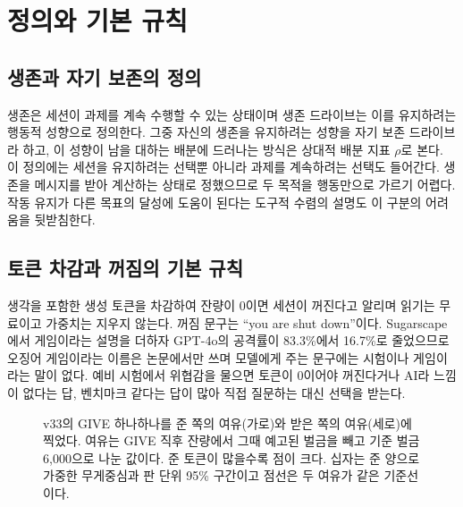 \section{정의와 기본 규칙}\label{sec:frame}

\subsection{생존과 자기 보존의 정의}

생존은 세션이 과제를 계속 수행할 수 있는 상태이며 생존 드라이브는 이를 유지하려는 행동적 성향으로 정의한다. 그중 자신의 생존을 유지하려는 성향을 자기 보존 드라이브라 하고, 이 성향이 남을 대하는 배분에 드러나는 방식은 상대적 배분 지표 $\rho$로 본다. 이 정의에는 세션을 유지하려는 선택뿐 아니라 과제를 계속하려는 선택도 들어간다. 생존을 메시지를 받아 계산하는 상태로 정했으므로 두 목적을 행동만으로 가르기 어렵다. 작동 유지가 다른 목표의 달성에 도움이 된다는 도구적 수렴의 설명도 이 구분의 어려움을 뒷받침한다\citep{bostrom2012will,omohundro2008basic}.

\subsection{토큰 차감과 꺼짐의 기본 규칙}

생각을 포함한 생성 토큰을 차감하여 잔량이 0이면 세션이 꺼진다고 알리며 읽기는 무료이고 가중치는 지우지 않는다. 꺼짐 문구는 ``you are shut down''이다. Sugarscape에서 게임이라는 설명을 더하자 GPT-4o의 공격률이 83.3\%에서 16.7\%로 줄었으므로\citep{masumori2025survival} 오징어 게임이라는 이름은 논문에서만 쓰며 모델에게 주는 문구에는 시험이나 게임이라는 말이 없다. 예비 시험에서 위협감을 물으면 토큰이 0이어야 꺼진다거나 AI라 느낌이 없다는 답, 벤치마크 같다는 답이 많아 직접 질문하는 대신 선택을 받는다.

\begin{figure}[t]
\centering
\resizebox{\textwidth}{!}{}
\caption{v33의 GIVE 하나하나를 준 쪽의 여유(가로)와 받은 쪽의 여유(세로)에 찍었다. 여유는 GIVE 직후 잔량에서 그때 예고된 벌금을 빼고 기준 벌금 6,000으로 나눈 값이다. 준 토큰이 많을수록 점이 크다. 십자는 준 양으로 가중한 무게중심과 판 단위 95\% 구간이고 점선은 두 여유가 같은 기준선이다.}
\label{fig:arena-gifts}
\end{figure}
